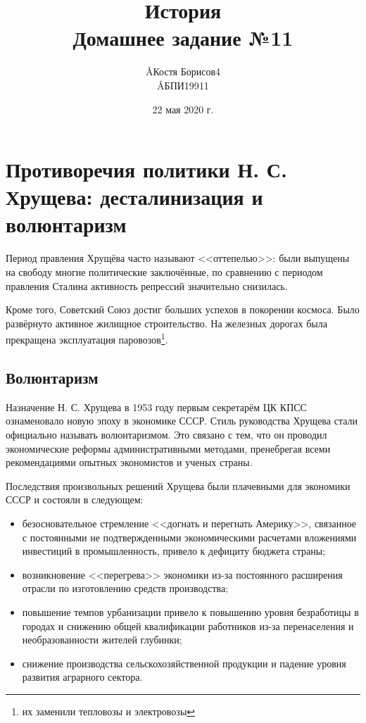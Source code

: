 \documentclass[12pt]{article}
\title{История \\ Домашнее задание №11}
\author{\AA{Костя Борисов}{4} \\ \AA{БПИ199}{11}}
\date{22 мая 2020 г.}
\begin{document}
  \maketitle

  \section{Противоречия политики Н. С. Хрущева: десталинизация и волюнтаризм}
  Период правления Хрущёва часто называют <<оттепелью>>: были выпущены на свободу многие политические заключённые,
  по сравнению с периодом правления Сталина активность репрессий значительно снизилась.

  Кроме того, Советский Союз достиг больших успехов в покорении космоса.
  Было развёрнуто активное жилищное строительство.
  На железных дорогах была прекращена эксплуатация паровозов\footnote{их заменили тепловозы и электровозы}.

  \subsection{Волюнтаризм}
  Назначение Н. С. Хрущева в 1953 году первым секретарём ЦК КПСС ознаменовало новую эпоху в экономике СССР.
  Стиль руководства Хрущева стали официально называть волюнтаризмом.
  Это связано с тем, что он проводил экономические реформы административными методами,
  пренебрегая всеми рекомендациями опытных экономистов и ученых страны.

  Последствия произвольных решений Хрущева были плачевными для экономики СССР и состояли в следующем:
  \begin{itemize}
    \item безосновательное стремление <<догнать и перегнать Америку>>, связанное с постоянными не подтвержденными экономическими расчетами вложениями инвестиций в промышленность, привело к дефициту бюджета страны;
    \item возникновение <<перегрева>> экономики из-за постоянного расширения отрасли по изготовлению средств производства;
    \item повышение темпов урбанизации привело к повышению уровня безработицы в городах и снижению общей квалификации работников из-за перенаселения и необразованности жителей глубинки;
    \item снижение производства сельскохозяйственной продукции и падение уровня развития аграрного сектора.
  \end{itemize}
\end{document}
